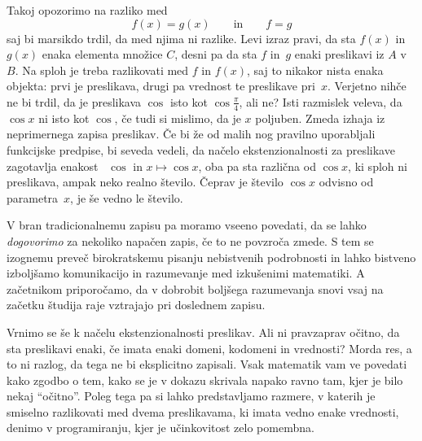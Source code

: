 Takoj opozorimo na razliko med
%
\begin{equation*}
  f(x) = g(x)
  \qquad\text{in}\qquad
  f = g
\end{equation*}
%
saj bi marsikdo trdil, da med njima ni razlike. Levi izraz pravi, da sta $f(x)$ in $g(x)$
enaka elementa množice $C$, desni pa da sta $f$ in~$g$ enaki preslikavi iz $A$ v $B$. Na
sploh je treba razlikovati med $f$ in $f(x)$, saj to nikakor nista enaka objekta: prvi je
preslikava, drugi pa vrednost te preslikave pri~$x$. Verjetno nihče ne bi trdil, da je
preslikava $\cos$ isto kot $\cos \frac{\pi}{4}$, ali ne? Isti razmislek veleva, da
$\cos x$ ni isto kot $\cos$, če tudi si mislimo, da je $x$ poljuben. Zmeda izhaja iz
neprimernega zapisa preslikav. Če bi že od malih nog pravilno uporabljali funkcijske
predpise, bi seveda vedeli, da načelo ekstenzionalnosti za preslikave zagotavlja enakost
~$\cos$ in $x \mapsto \cos x$, oba pa sta različna od $\cos x$, ki sploh ni preslikava,
ampak neko realno število. Čeprav je število $\cos x$ odvisno od parametra~$x$, je še
vedno le število.

V bran tradicionalnemu zapisu pa moramo vseeno povedati, da se lahko \emph{dogovorimo} za
nekoliko napačen zapis, če to ne povzroča zmede. S tem se izognemu preveč birokratskemu
pisanju nebistvenih podrobnosti in lahko bistveno izboljšamo komunikacijo in razumevanje
med izkušenimi matematiki. A začetnikom priporočamo, da v dobrobit boljšega razumevanja
snovi vsaj na začetku študija raje vztrajajo pri doslednem zapisu.

Vrnimo se še k načelu ekstenzionalnosti preslikav. Ali ni pravzaprav očitno, da sta
preslikavi enaki, če imata enaki domeni, kodomeni in vrednosti? Morda res, a to ni razlog,
da tega ne bi eksplicitno zapisali. Vsak matematik vam ve povedati kako zgodbo o tem,
kako se je v dokazu skrivala napako ravno tam, kjer je bilo nekaj ``očitno''. Poleg tega
pa si lahko predstavljamo razmere, v katerih je smiselno razlikovati med dvema
preslikavama, ki imata vedno enake vrednosti, denimo v programiranju, kjer je učinkovitost
zelo pomembna.





